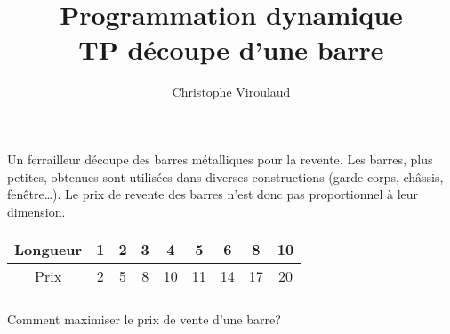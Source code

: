 \documentclass[svgnames,11pt]{beamer}
\author[]{Christophe Viroulaud}
\title{Programmation dynamique\\TP découpe d'une barre}
\date{\framebox{\textbf{Algo 26}}}
\institute{Terminale - NSI}
\begin{document}
\begin{frame}
\titlepage
\end{frame}
\begin{frame}
    \frametitle{}

    Un ferrailleur découpe des barres métalliques pour la revente. Les barres, plus petites, obtenues sont utilisées dans diverses constructions (garde-corps, châssis, fenêtre\dots). Le prix de revente des barres n'est donc pas proportionnel à leur dimension.
\begin{center}
    \begin{tabular}{|*{9}{c|}}
        \hline
        Longueur & 1 & 2 & 3 & 4 & 5 & 6 & 8 & 10 \\
        \hline
        Prix & 2 & 5 & 8 & 10 & 11 & 14 & 17 & 20 \\
        \hline
    \end{tabular}
\end{center}

\end{frame}
\begin{frame}
    \frametitle{}

    \begin{framed}
        \centering Comment maximiser le prix de vente d'une barre?
    \end{framed}

\end{frame}
\end{document}
